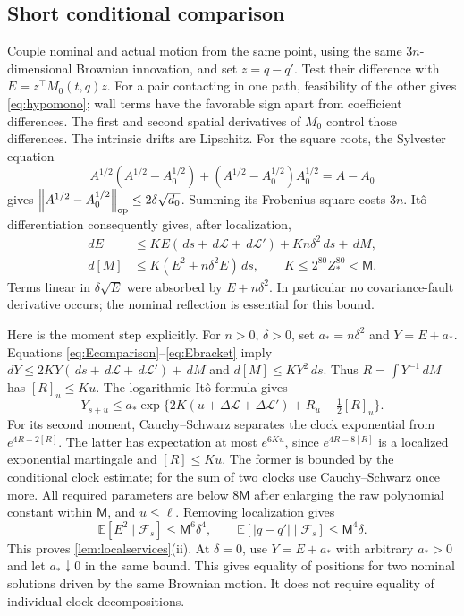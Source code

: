 \documentclass[11pt]{article}
\numberwithin{equation}{section}
\theoremstyle{definition}
\theoremstyle{remark}\newtheorem{remark}[theorem]{Remark}
\newcommand{\E}{\mathbb E}
\newcommand{\ds}{\,ds}
\newcommand{\dd}{\,d}
\newcommand{\norm}[1]{\left\|#1\right\|}
\begin{document}
\subsection{Short conditional comparison}
\label{app:comparison}

Couple nominal and actual motion from the same point, using the same
$3n$-dimensional Brownian innovation, and set $z=q-q'$. Test their
difference with $E=z^\top M_0(t,q)z$. For a pair contacting in one path,
feasibility of the other gives \eqref{eq:hypomono}; wall terms have the
favorable sign apart from coefficient differences. The first and second
spatial derivatives of $M_0$ control those differences. The intrinsic
drifts are Lipschitz. For the square roots, the Sylvester equation
\[
 A^{1/2}(A^{1/2}-A_0^{1/2})
 +(A^{1/2}-A_0^{1/2})A_0^{1/2}=A-A_0
\]
gives $\norm{A^{1/2}-A_0^{1/2}}_{\rm op}
\le2\delta\sqrt{d_0}$. Summing its Frobenius square costs $3n$.
It\^o differentiation consequently gives, after localization,
\begin{align}
 dE&\le K E(\ds+\dd\mathcal L+\dd\mathcal L')
                         +Kn\delta^2\ds+\dd M,\label{eq:Ecomparison}\\
 d[M]&\le K(E^2+n\delta^2E)\ds,\qquad
 K\le2^{80}Z_*^{80}<\mathsf M.\label{eq:Ebracket}
\end{align}
Terms linear in $\delta\sqrt E$ were absorbed by $E+n\delta^2$.
In particular no covariance-fault derivative occurs; the nominal
reflection is essential for this bound.

Here is the moment step explicitly. For $n>0$, $\delta>0$, set
$a_*=n\delta^2$ and $Y=E+a_*$. Equations
\eqref{eq:Ecomparison}--\eqref{eq:Ebracket} imply
$dY\le2KY(\ds+\dd\mathcal L+\dd\mathcal L')+\dd M$ and
$d[M]\le KY^2\ds$. Thus $R=\int Y^{-1}\dd M$ has
$[R]_u\le Ku$. The logarithmic It\^o formula gives
\[
 Y_{s+u}\le a_*\exp\{2K(u+\Delta\mathcal L+
                  \Delta\mathcal L')+R_u-\tfrac12[R]_u\}.
\]
For its second moment, Cauchy--Schwarz separates the clock exponential
from $e^{4R-2[R]}$. The latter has expectation at most $e^{6Ku}$,
since $e^{4R-8[R]}$ is a localized exponential martingale and
$[R]\le Ku$. The former is bounded by the conditional clock estimate;
for the sum of two clocks use Cauchy--Schwarz once more. All required
parameters are below $8\mathsf M$ after enlarging the raw polynomial
constant within $\mathsf M$, and $u\le\ell$. Removing localization gives
\[
 \E[E^2\mid\mathcal F_s]\le\mathsf M^6\delta^4,
 \qquad \E[|q-q'|\mid\mathcal F_s]\le\mathsf M^4\delta.
\]
This proves \cref{lem:localservices}(ii). At $\delta=0$, use
$Y=E+a_*$ with arbitrary $a_*>0$ and let $a_*\downarrow0$ in the same
bound. This gives equality of positions for two nominal solutions driven
by the same Brownian motion.
It does not require equality of individual clock decompositions.
\end{document}
